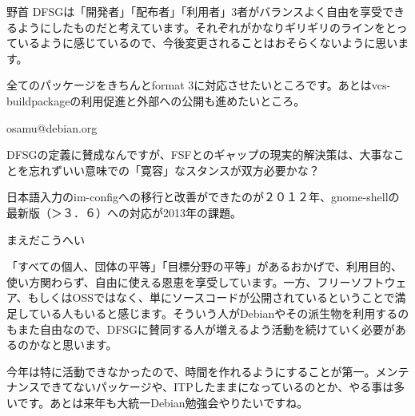 \begin{prework}{ 野首 }
 DFSGは「開発者」「配布者」「利用者」3者がバランスよく自由を享受できるようにしたものだと考えています。それぞれがかなりギリギリのラインをとっているように感じているので、今後変更されることはおそらくないように思います。

 全てのパッケージをきちんとformat 3に対応させたいところです。あとはvcs-buildpackageの利用促進と外部への公開も進めたいところ。

\end{prework}

\begin{prework}{ osamu@debian.org }

 DFSGの定義に賛成なんですが、FSFとのギャップの現実的解決策は、大事なことを忘れずいい意味での「寛容」なスタンスが双方必要かな？

日本語入力のim-configへの移行と改善ができたのが２０１２年、gnome-shellの最新版（＞３．６）への対応が2013年の課題。

\end{prework}

\begin{prework}{ まえだこうへい }

 「すべての個人、団体の平等」「目標分野の平等」があるおかげで、利用目的、使い方関わらず、自由に使える恩恵を享受しています。一方、フリーソフトウェア、もしくはOSSではなく、単にソースコードが公開されているということで満足している人もいると感じます。そういう人がDebianやその派生物を利用するのもまた自由なので、DFSGに賛同する人が増えるよう活動を続けていく必要があるのかなと思います。

 今年は特に活動できなかったので、時間を作れるようにすることが第一。メンテナンスできてないパッケージや、ITPしたままになっているのとか、やる事は多いです。あとは来年も大統一Debian勉強会やりたいですね。
\end{prework}

